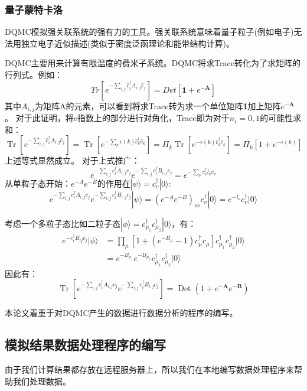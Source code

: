 \subsubsection{量子蒙特卡洛}
DQMC模拟强关联系统的强有力的工具。强关联系统意味着量子粒子(例如电子)无法用独立电子近似描述(类似于密度泛函理论和能带结构计算)。

DQMC主要用来计算有限温度的费米子系统。DQMC将求Trace转化为了求矩阵的行列式。例如：
$$Tr[e^{- \sum_{i,j}\widehat{c}^\dagger_i A_{i,j}\widehat{c}_j}]=Det[\textbf{1}+e^{-\textbf{A}}]$$
其中$A_{i,j}$为矩阵A的元素，可以看到将求Trace转为求一个单位矩阵\textbf{1}加上矩阵$e^{-\textbf{A}}$。
对于此证明，将e指数上的部分进行对角化，Trace即为对于$n_i=0,1$的可能性求和：
$$
\operatorname{Tr}\left[e^{-\sum_{i, j} \hat{c}_{i}^{\dagger} A_{i, j} \hat{c}_{j}}\right]=\operatorname{Tr}\left[e^{-\sum_{k} \epsilon(k) \hat{c}_{k}^{\dagger} \hat{c}_{k}}\right]=\Pi_{k} \operatorname{Tr}\left[e^{-\epsilon(k) \hat{c}_{k}^{\dagger} \hat{c}_{k}}\right]=\Pi_{k}\left[1+e^{-\epsilon(k)}\right]
$$
上述等式显然成立。
对于上式推广：
$$
e^{-\sum_{i, j} c_{i}^{\dagger} A_{i, j} c_{j}} e^{-\sum_{i, j} c_{i}^{\dagger} B_{i, j} c_{j}}=e^{-\sum_{\nu} c_{\nu}^{\dagger} l_{\nu} c_{\nu}}
$$
从单粒子态开始：$e^{-A}e^{-B}$的作用在$|\psi \rangle=c^{\dagger}_v|0\rangle$:
$$
e^{-\sum_{i, j} c_{i}^{\dagger} A_{i, j} c_{j}} e^{-\sum_{i, j} c_{i}^{\dagger} B_{i, j} c_{j}}|\psi\rangle=\left(e^{-A} e^{-B}\right)_{\nu \nu} c_{\nu}^{\dagger}|0\rangle=e^{-l_{\nu}} c_{\nu}^{\dagger}|0\rangle
$$

考虑一个多粒子态比如二粒子态$|\phi\rangle=c^\dagger _{\mu_1}c^\dagger _{\mu_2}|0\rangle$，有：
$$
\begin{aligned}
e^{-c_{i}^{\dagger} B_{i j} c_{j}}|\phi\rangle &=\prod_{\mu}\left[1+\left(e^{-B_{\mu}}-1\right) c_{\mu}^{\dagger} c_{\mu}\right] c_{\mu_{1}}^{\dagger} c_{\mu_{2}}^{\dagger}|0\rangle \\
&=e^{-B_{\mu_{1}}} e^{-B_{\mu_{2}}} c_{\mu_{1}}^{\dagger} c_{\mu_{2}}^{\dagger}|0\rangle
\end{aligned}
$$
因此有：
$$
\operatorname{Tr}\left[e^{-\sum_{i, j} c_{i}^{\dagger} A_{i, j} c_{j}} e^{-\sum_{i, j} c_{i}^{\dagger} B_{i, j} c_{j}}\right]=\operatorname{Det}\left(1+e^{-\mathbf{A}} e^{-\mathbf{B}}\right)
$$

本论文着重于对DQMC产生的数据进行数据分析的程序的编写。
\subsection{模拟结果数据处理程序的编写}
由于我们计算结果都存放在远程服务器上，所以我们在本地编写数据处理程序来帮助我们处理数据。
